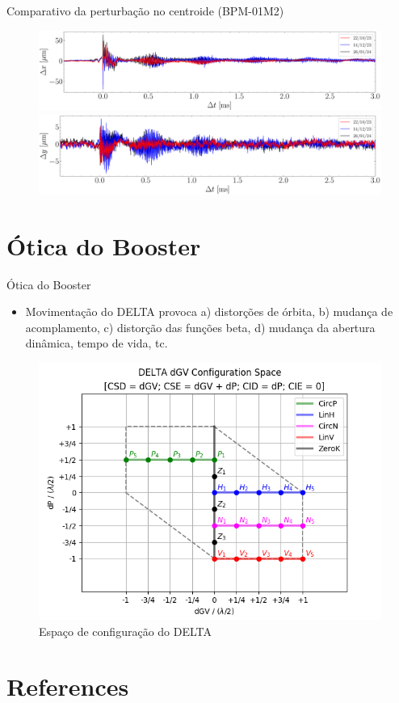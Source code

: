 \documentclass{beamer}					  %
\begin{document}
\begin{frame}{Comparativo da perturbação no centroide (BPM-01M2)}
    \begin{figure}[H]
        	\centering
            \includegraphics[width=1.0\textwidth]{2024-02-16/figures/injection_perturbation_compare_x_2024.pdf}
            \includegraphics[width=1.0\textwidth]{2024-02-16/figures/injection_perturbation_compare_y_2024.pdf}
    \end{figure} 
\end{frame}



\section{Ótica do Booster}

\begin{frame}{Ótica do Booster}
    \begin{itemize}
        \item Movimentação do DELTA provoca a) distorções de órbita, b) mudança de acomplamento, c) distorção das funções beta, d) mudança da abertura dinâmica, tempo de vida, tc.
    \end{itemize}
    \begin{figure}[H]
    		\centering
            \includegraphics[width=.8\textwidth]{2024-02-16/figures/id-delta-dgv-config-space.png}
            \caption{Espaço de configuração do DELTA}
            \label{fig:delta-config-space}
    \end{figure}
\end{frame}



\section{References}
\end{document}
